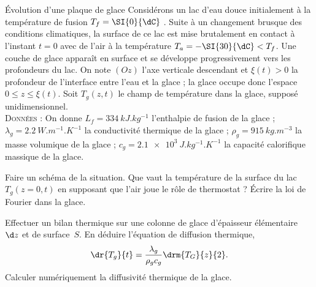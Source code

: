 \begin{exo}[PC][3][TD]{Évolution d'une plaque de glace}%
Considérons un lac d’eau douce initialement à la température de fusion $T_{f}=\SI{0}{\dC}$ . Suite à un changement brusque des conditions climatiques, la surface de ce lac est mise brutalement en contact à l'instant $t=0$ avec de l’air à la température $T_{a}=-\SI{30}{\dC}<T_{f}$. Une couche de glace apparaît en surface et se développe progressivement vers les profondeurs du lac. On note $(Oz)$ l’axe verticale descendant et $\xi(t)>0$ la profondeur de l'interface entre l'eau et la glace ; la glace occupe donc l'espace $0\leq z\leq\xi(t)$. Soit $T_{g}(z,t)$ le champ de température dans la glace, supposé unidimensionnel.\\

\textsc{Données} : On donne $L_{ f}=\SI{334}{kJ.kg^{-1}}$ l'enthalpie de fusion de la glace ;   $\lambda_{g} = \SI{2.2}{W.m^{-1}.K^{-1}}$ la conductivité thermique de la glace ; $\rho_g = \SI{915}{kg.m^{-3}}$ la masse volumique de la glace ; $c_g = \SI{2.1e3}{J.kg^{-1}.K^{-1}}$ la capacité calorifique massique de la glace.

\begin{quest}
  \item Faire un schéma de la situation. Que vaut la température de la surface du lac $T_{g}(z=0,t)$ en supposant que l’air joue le rôle de thermostat ? Écrire la loi de Fourier dans la glace.





  \item Effectuer un bilan thermique sur une colonne de glace d’épaisseur élémentaire $\d z$ et de surface~$S$. En déduire l'équation de diffusion thermique,
  \begin{equation}\label{eq:diffu}
  \dr{T_{g}}{t} = \frac{\lambda_{g}}{\rho_{g}c_{g}}\drm{T_{G}}{z}{2}.
  \end{equation}
   Calculer numériquement la diffusivité thermique de la glace.


\end{quest}
\end{exo}
